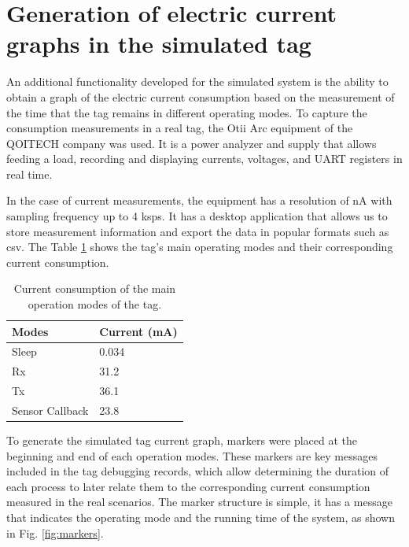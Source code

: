 \documentclass[journal]{IEEEtran}	%
\begin{document}
\section{Generation of electric current graphs in the simulated tag}
\label{sec:current}


An additional functionality developed for the simulated system is the ability to obtain a graph of the electric current consumption based on the measurement of the time that the tag remains in different operating modes. To capture the consumption measurements in a real tag, the Otii Arc equipment of the QOITECH company was used. It is a power analyzer and supply that allows feeding a load, recording and displaying currents, voltages, and UART registers in real time.

In the case of current measurements, the equipment has a resolution of nA with sampling frequency up to 4 ksps. It has a desktop application that allows us to store measurement information and export the data in popular formats such as csv. The Table \ref{tab:currents} shows the tag's main operating modes and their corresponding current consumption.

\begin{table}[h!]
    \renewcommand{\arraystretch}{1.25}		%
    \centering
    \caption{Current consumption of the main operation modes of the tag.}	%
    \label{tab:currents}
    \begin{tabular}{l|l}					%
    \hline \hline
    \textbf{Modes}        &    \textbf{Current (mA)}\\
    \hline
    Sleep               &   0.034\\
    Rx                  &   31.2\\
    Tx                  &   36.1\\
    Sensor Callback     &   23.8\\
    \hline \hline
    \end{tabular}
\end{table}

To generate the simulated tag current graph, markers were placed at the beginning and end of each operation modes. These markers are key messages included in the tag debugging records, which allow determining the duration of each process to later relate them to the corresponding current consumption measured in the real scenarios. The marker structure is simple, it has a message that indicates the operating mode and the running time of the system, as shown in Fig. \ref{fig:markers}.
\end{document}
